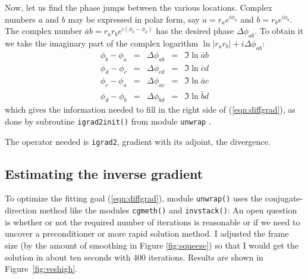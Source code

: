 Now, let us find the phase jumps between the various locations. Complex numbers $a$ and $b$ may be expressed in polar form, say $a=r_ae^{i\phi_a}$ and $b=r_be^{i\phi_b}$.
The complex number 
$\bar a b = r_a r_b e^{i(\phi_b-\phi_a)}$ has the desired phase
$\Delta \phi_{ab}$.
To obtain it we take the imaginary part of the complex logarithm
$\ln |r_a r_b| + i\Delta \phi_{ab}$:
\begin{equation}
  \begin{array}{lllll}
        \phi_b-\phi_a &=& \Delta \phi_{ab} &=& \Im \ln  \bar a b\\
        \phi_d-\phi_c &=& \Delta \phi_{cd} &=& \Im \ln  \bar c d\\
        \phi_c-\phi_a &=& \Delta \phi_{ac} &=& \Im \ln  \bar a c\\
        \phi_d-\phi_b &=& \Delta \phi_{bd} &=& \Im \ln  \bar b d
  \end{array}
\label{eqn:thedeltas}
\end{equation}
which gives the information needed to fill in the right side of
(\ref{eqn:diffgrad}), as done by subroutine \texttt{igrad2init()} from
module \texttt{unwrap} .

The operator needed is \texttt{igrad2},
gradient with its adjoint, the divergence. 

\subsection{Estimating the inverse gradient}
To optimize the fitting goal (\ref{eqn:diffgrad}),
module \texttt{unwrap()} uses the conjugate-direction method
like the modules \texttt{cgmeth()}
and 
\texttt{invstack()}:
An open question is whether or not the required number of iterations is reasonable
or if we need to uncover a preconditioner
or more rapid solution method.
I adjusted the frame size 
(by the amount of smoothing in Figure \ref{fig:squeeze})
so that I would get the solution in about ten seconds with 400 iterations.
Results are shown in Figure~\ref{fig:veshigh}.

\begin{comment}
When we are working with figures like Figure~\ref{fig:veshigh},
the number of iterations often exceeds the number of intermediate
output frames that we care to deal with.
The computer function \texttt{klick()} is a simple tool
to detect logarithmically spaced intervals for taking snapshots
of iterative descent.
\progdex{klick}{Logarithmic increment detect}
\end{comment}

